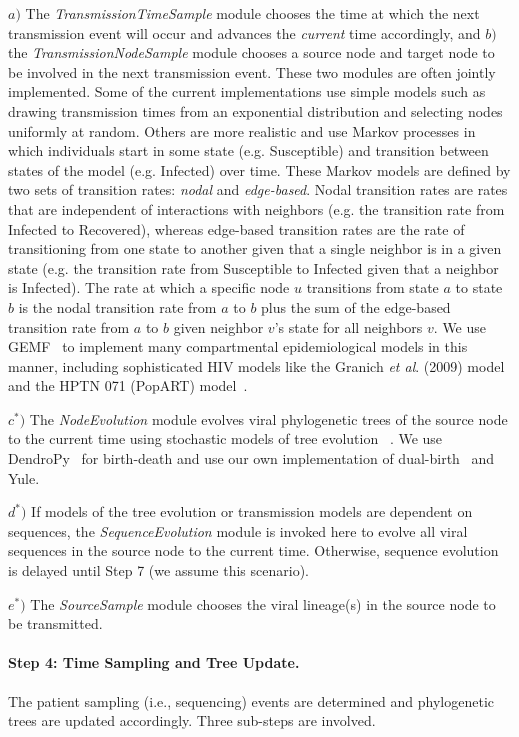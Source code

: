 $a)$ The \textit{TransmissionTimeSample} module chooses the time at which the next transmission event will occur and advances the \textit{current} time accordingly, and $b)$ the \textit{TransmissionNodeSample} module chooses a source node and target node to be involved in the next transmission event. These two modules are often jointly implemented. Some of the current implementations use simple models such as drawing transmission times from an exponential distribution and selecting nodes uniformly at random. Others are more realistic and use Markov processes in which individuals start in some state (e.g. Susceptible) and transition between states of the model (e.g. Infected) over time. These Markov models are defined by two sets of transition rates: \textit{nodal} and \textit{edge-based}. Nodal transition rates are rates that are independent of interactions with neighbors (e.g. the transition rate from Infected to Recovered), whereas edge-based transition rates are the rate of transitioning from one state to another given that a single neighbor is in a given state (e.g. the transition rate from Susceptible to Infected given that a neighbor is Infected). The rate at which a specific node $u$ transitions from state $a$ to state $b$ is the nodal transition rate from $a$ to $b$ plus the sum of the edge-based transition rate from $a$ to $b$ given neighbor $v$'s state for all neighbors $v$. We use GEMF~\cite{Sahneh2017} to implement many compartmental epidemiological models in this manner, including sophisticated \gls{HIV} models like the Granich \textit{et al}. (2009) model~\cite{Granich2009} and the HPTN 071 (PopART) model~\cite{Cori2014}.

$c^*)$ The \textit{NodeEvolution} module evolves viral phylogenetic trees of the source node to the current time using stochastic models of tree evolution ~\cite{Hartmann2010}. We use DendroPy~\cite{Sukumaran2010} for birth-death  and use our own implementation of dual-birth~\cite{Moshiri2017} and Yule.

$d^*)$ If models of the tree evolution or transmission models are dependent on sequences, the \textit{SequenceEvolution} module is invoked here to evolve all viral sequences in the source node to the current time. Otherwise, sequence evolution is delayed until Step 7 (we assume this scenario).

$e^*)$ The \textit{SourceSample} module chooses the viral lineage(s) in the source node to be transmitted.

\paragraph{Step 4: Time Sampling and Tree Update.} The patient sampling (i.e., sequencing) events are determined and phylogenetic trees are updated accordingly. Three sub-steps are involved.

